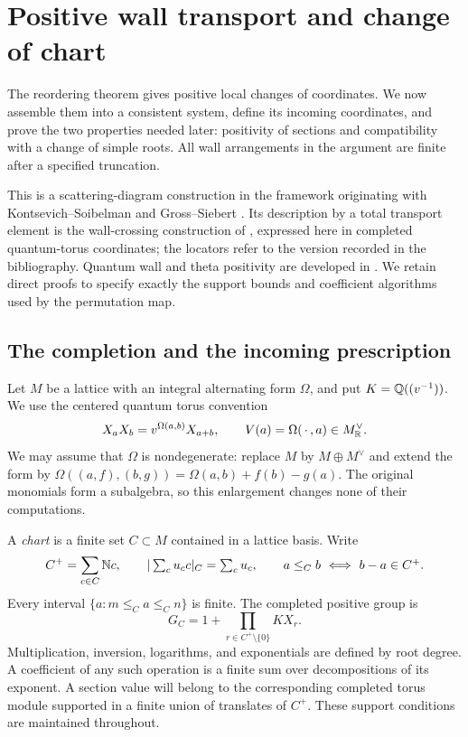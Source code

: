 \section{Positive wall transport and change of chart}
\label{wall:section}

The reordering theorem gives positive local changes of coordinates.  We
now assemble them into a consistent system, define its incoming
coordinates, and prove the two properties needed later: positivity of
sections and compatibility with a change of simple roots.  All wall
arrangements in the argument are finite after a specified truncation.

This is a scattering-diagram construction in the framework originating
with Kontsevich--Soibelman and Gross--Siebert \cite{KS06,GS11}.  Its
description by a total transport element is the wall-crossing
construction of \cite[Theorem~2.1.6 and Proposition~2.1.12]{KS14},
expressed here in completed quantum-torus coordinates; the locators
refer to the version recorded in the bibliography.  Quantum wall and
theta positivity are developed in \cite{DM21}.  We retain direct
proofs to specify exactly the support bounds and coefficient algorithms
used by the permutation map.

\subsection{The completion and the incoming prescription}

Let $M$ be a lattice with an integral alternating form $\Omega$, and put
$K=\mathbb Q((v^{-1}))$.  We use the centered quantum torus convention
\begin{equation}
 X_aX_b=v^{\Omega(a,b)}X_{a+b},
 \qquad V(a)=\Omega(\,\cdot\,,a)\in M^\vee_{\mathbb R}.
 \label{wall:torus}
\end{equation}
We may assume that $\Omega$ is nondegenerate: replace $M$ by
$M\oplus M^\vee$ and extend the form by
$\Omega((a,f),(b,g))=\Omega(a,b)+f(b)-g(a)$.
The original monomials form a subalgebra, so this enlargement changes
none of their computations.

A \emph{chart} is a finite set $C\subset M$ contained in a lattice
basis.  Write
\[
 C^+=\sum_{c\in C}\mathbb N c,\qquad
 |\textstyle\sum_c u_cc|_C=\sum_cu_c,\qquad
 a\le_C b\ \Longleftrightarrow\ b-a\in C^+.
\]
Every interval $\{a:m\le_C a\le_C n\}$ is finite.  The completed
positive group is
\[
 G_C=1+\prod_{r\in C^+\setminus\{0\}}KX_r.
\]
Multiplication, inversion, logarithms, and exponentials are defined
by root degree.  A coefficient of any such operation is a finite sum
over decompositions of its exponent.  A section value will belong to
the corresponding completed torus module supported in a finite union
of translates of $C^+$.  These support conditions are maintained
throughout.

